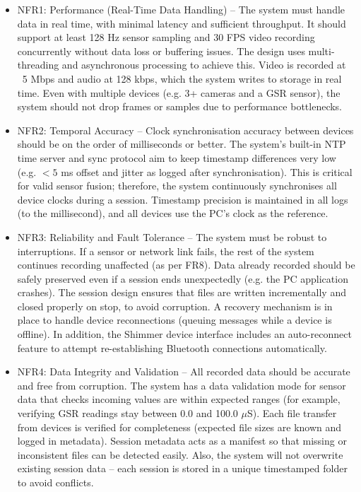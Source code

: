 \begin{itemize}
  \item NFR1: Performance (Real-Time Data Handling) -- The system must handle data in real time, with minimal latency and sufficient throughput. It should support at least 128 Hz sensor sampling and 30 FPS video recording concurrently without data loss or buffering issues. The design uses multi-threading and asynchronous processing to achieve this. Video is recorded at ~5 Mbps and audio at 128 kbps, which the system writes to storage in real time. Even with multiple devices (e.g. 3+ cameras and a GSR sensor), the system should not drop frames or samples due to performance bottlenecks.

  \item NFR2: Temporal Accuracy -- Clock synchronisation accuracy between devices should be on the order of milliseconds or better. The system's built-in NTP time server and sync protocol aim to keep timestamp differences very low (e.g. $<5$ ms offset and jitter as logged after synchronisation). This is critical for valid sensor fusion; therefore, the system continuously synchronises all device clocks during a session. Timestamp precision is maintained in all logs (to the millisecond), and all devices use the PC's clock as the reference.

  \item NFR3: Reliability and Fault Tolerance -- The system must be robust to interruptions. If a sensor or network link fails, the rest of the system continues recording unaffected (as per FR8). Data already recorded should be safely preserved even if a session ends unexpectedly (e.g. the PC application crashes). The session design ensures that files are written incrementally and closed properly on stop, to avoid corruption. A recovery mechanism is in place to handle device reconnections (queuing messages while a device is offline). In addition, the Shimmer device interface includes an auto-reconnect feature to attempt re-establishing Bluetooth connections automatically.

  \item NFR4: Data Integrity and Validation -- All recorded data should be accurate and free from corruption. The system has a data validation mode for sensor data that checks incoming values are within expected ranges (for example, verifying GSR readings stay between 0.0 and 100.0 $\mu$S). Each file transfer from devices is verified for completeness (expected file sizes are known and logged in metadata). Session metadata acts as a manifest so that missing or inconsistent files can be detected easily. Also, the system will not overwrite existing session data -- each session is stored in a unique timestamped folder to avoid conflicts.


\end{itemize}
